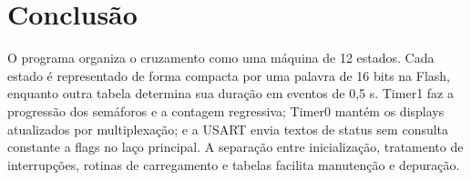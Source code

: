 \documentclass[12pt,a4paper]{article}
\begin{document}
\section{Conclusão}
O programa organiza o cruzamento como uma máquina de 12 estados. Cada estado é representado de forma compacta por uma palavra de 16 bits na Flash, enquanto outra tabela determina sua duração em eventos de 0,5 s. Timer1 faz a progressão dos semáforos e a contagem regressiva; Timer0 mantém os displays atualizados por multiplexação; e a USART envia textos de status sem consulta constante a flags no laço principal. A separação entre inicialização, tratamento de interrupções, rotinas de carregamento e tabelas facilita manutenção e depuração.
\end{document}
